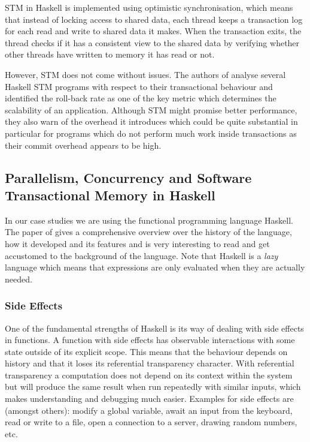 STM in Haskell is implemented using optimistic synchronisation, which means that instead of locking access to shared data, each thread keeps a transaction log for each read and write to shared data it makes. When the transaction exits, the thread checks if it has a consistent view to the shared data by verifying whether other threads have written to memory it has read or not. %

However, STM does not come without issues. The authors of \cite{perfumo_limits_2008} analyse several Haskell STM programs with respect to their transactional behaviour and identified the roll-back rate as one of the key metric which determines the scalability of an application. Although STM might promise better performance, they also warn of the overhead it introduces which could be quite substantial in particular for programs which do not perform much work inside transactions as their commit overhead appears to be high.

\subsection{Parallelism, Concurrency and Software Transactional Memory in Haskell}
In our case studies we are using the functional programming language Haskell. The paper of \cite{hudak_history_2007} gives a comprehensive overview over the history of the language, how it developed and its features and is very interesting to read and get accustomed to the background of the language. Note that Haskell is a \textit{lazy} language which means that expressions are only evaluated when they are actually needed.

\subsubsection{Side Effects}
\label{sub:side_effects}
One of the fundamental strengths of Haskell is its way of dealing with side effects in functions. A function with side effects has observable interactions with some state outside of its explicit scope. This means that the behaviour depends on history and that it loses its referential transparency character. With referential transparency a computation does not depend on its context within the system but will produce the same result when run repeatedly with similar inputs, which makes understanding and debugging much easier. Examples for side effects are (amongst others): modify a global variable, await an input from the keyboard, read or write to a file, open a connection to a server, drawing random numbers, etc.

